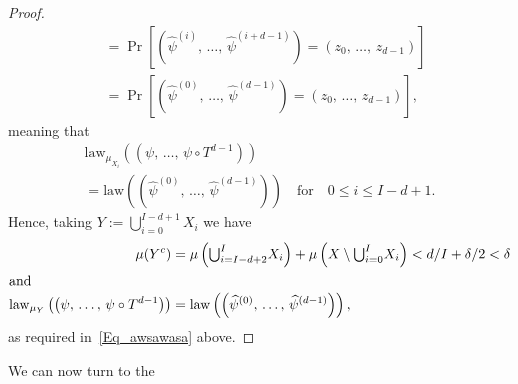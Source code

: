 \documentclass[AHL,Unicode,longabstracts]{cedram}
\newcommand{\law}{\mathrm{law}}
\begin{document}
\begin{proof}
\begin{align*}
& =\Pr\left[\left(\widehat{\psi}^{(i)},\,\ldots,\,\widehat{\psi}^{(i+d-1)}\right)=\left(z_{0},\,\ldots,\,z_{d-1}\right)\right]\\
& =\Pr\left[\left(\widehat{\psi}^{(0)},\,\ldots,\,\widehat{\psi}^{(d-1)}\right)=\left(z_{0},\,\ldots,\,z_{d-1}\right)\right]\text{,}
\end{align*}
meaning that
\begin{multline}
\law_{\mu_{X_{i}}}\left(\left(\psi,\,\ldots,\,\psi\circ T^{d-1}\right)\right)\\
=\law \left(\left(\widehat{\psi}^{(0)},\,\ldots,\,\widehat{\psi}^{(d-1)}\right)\right)\quad\text{for}\quad 0\leq i\leq I-d+1.
\end{multline}
Hence, taking $Y:= {\textstyle\bigcup\nolimits_{i=0}^{I-d+1}} X_{i}$ we have 
\begin{align*}
\mu(Y^{c}) &=\mu\left({\textstyle\bigcup\nolimits_{i=I-d+2}^{I}} X_{i}\right)+\mu\left(X\setminus {\textstyle\bigcup\nolimits_{i=0}^{I}} X_{i}\right)<d/I+\delta/2<\delta
\\
\intertext{and} 
\law_{\mu_{Y}}\left(\left(\psi,\,\ldots,\,\psi\circ T^{d-1}\right)\right) &=\law\left(\left(\widehat{\psi}^{(0)},\,\ldots,\,\widehat{\psi}^{(d-1)}\right)\right),
\end{align*}
as required in~\eqref{Eq_awsawasa} above.
\end{proof}


We can now turn to the
\end{document}
